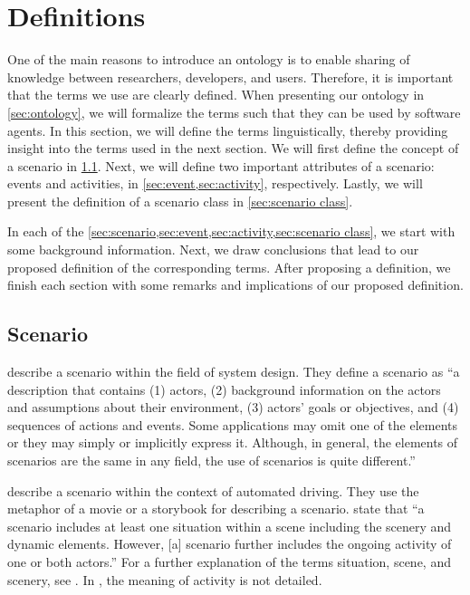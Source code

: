 \section{Definitions}
\label{sec:definitions}

One of the main reasons to introduce an ontology is to enable sharing of knowledge between researchers, developers, and users. 
Therefore, it is important that the terms we use are clearly defined. 
When presenting our ontology in \cref{sec:ontology}, we will formalize the terms such that they can be used by software agents.
In this section, we will define the terms linguistically, thereby providing insight into the terms used in the next section.
We will first define the concept of a scenario in \cref{sec:scenario}. 
Next, we will define two important attributes of a scenario: events and activities, in \cref{sec:event,sec:activity}, respectively. 
Lastly, we will present the definition of a scenario class in \cref{sec:scenario class}.

\cbstartc
In each of the \cref{sec:scenario,sec:event,sec:activity,sec:scenario class}, we start with some background information. Next, we draw conclusions that lead to our proposed definition of the corresponding terms. After proposing a definition, we finish each section with some remarks and implications of our proposed definition.
\cbend



\subsection{Scenario}
\label{sec:scenario}

\textcite{go2004blind} describe a scenario within the field of system design. They define a scenario as ``a description that contains (1) actors, (2) background information on the actors and assumptions about their environment, (3) actors' goals or objectives, and (4) sequences of actions and events. Some applications may omit one of the elements or they may simply or implicitly express it. Although, in general, the elements of scenarios are the same in any field, the use of scenarios is quite different.'' 

\textcite{geyer2014} describe a scenario within the context of automated driving. They use the metaphor of a movie or a storybook for describing a scenario. \textcite{geyer2014} state that ``a scenario includes at least one situation within a scene including the scenery and dynamic elements. However, [a] scenario further includes the ongoing activity of one or both actors.'' For a further explanation of the terms situation, scene, and scenery, see \cite{geyer2014}. 
In \cite{geyer2014}, the meaning of activity is not detailed.

